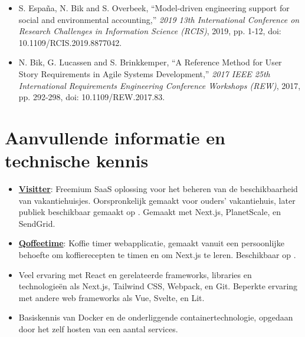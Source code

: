 \documentclass[10pt]{article}
\begin{document}
\begin{itemize}
    \item S. España, N. Bik and S. Overbeek, \enquote{Model-driven engineering support for social and environmental accounting,} \textit{2019 13th International Conference on Research Challenges in Information Science (RCIS)}, 2019, pp. 1-12, doi:\\ 10.1109/RCIS.2019.8877042.
    \item N. Bik, G. Lucassen and S. Brinkkemper, \enquote{A Reference Method for User Story Requirements in Agile Systems Development,} \textit{2017 IEEE 25th International Requirements Engineering Conference Workshops (REW)}, 2017, pp. 292-298, doi: 10.1109/REW.2017.83.
\end{itemize}

\section{Aanvullende informatie en technische kennis}
\label{sec:other}

\begin{itemize}
    \item \textbf{\underline{Visitter}}: Freemium SaaS oplossing voor het beheren van de beschikbaarheid van vakantiehuisjes. Oorspronkelijk gemaakt voor ouders' vakantiehuis, later publiek beschikbaar gemaakt op  . Gemaakt met Next.js, PlanetScale, en SendGrid.
    \item \textbf{\underline{Qoffeetime}}: Koffie timer webapplicatie, gemaakt vanuit een persoonlijke behoefte om koffierecepten te timen en om Next.js te leren. Beschikbaar op .
    \item Veel ervaring met React en gerelateerde frameworks, libraries en technologieën als Next.js, Tailwind CSS, Webpack, en Git. Beperkte ervaring met andere web frameworks als Vue, Svelte, en Lit.
    \item Basiskennis van Docker en de onderliggende containertechnologie, opgedaan door het zelf hosten van een aantal services.
\end{itemize}
\end{document}
